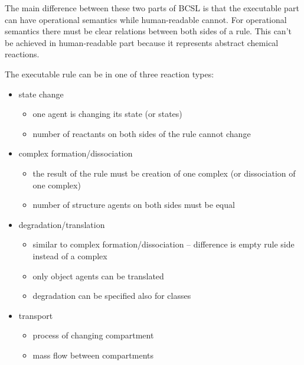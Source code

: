 \documentclass[12pt]{article}
\begin{document}
The main difference between these two parts of BCSL is that the executable part can have operational semantics while human-readable cannot. For operational semantics there must be clear relations between both sides of a rule. This can't be achieved in human-readable part because it represents abstract chemical reactions. 

The executable rule can be in one of three reaction types:

\begin{itemize}
\item state change
	\begin{itemize}	
		\item one agent is changing its state (or states)
		\item number of reactants on both sides of the rule cannot change
	\end{itemize}
\item complex formation/dissociation 
	\begin{itemize}
		\item the result of the rule must be creation of one complex (or dissociation of one complex)
		\item number of structure agents on both sides must be equal
	\end{itemize} 
\item degradation/translation 
	\begin{itemize}
		\item similar to complex formation/dissociation -- difference is empty rule side instead of a complex
		\item only object agents can be translated
		\item degradation can be specified also for classes
	\end{itemize} 
\item transport
	\begin{itemize}
		\item process of changing compartment
		\item mass flow between compartments
	\end{itemize}
\end{itemize}
\end{document}
